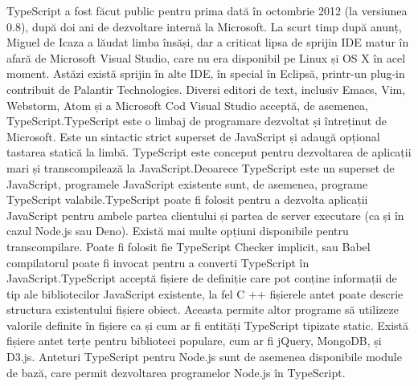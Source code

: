 \par TypeScript a fost făcut public pentru prima dată în octombrie 2012 (la versiunea 0.8), după doi ani de dezvoltare internă la Microsoft. La scurt timp după anunț, Miguel de Icaza a lăudat limba însăși, dar a criticat lipsa de sprijin IDE matur în afară de Microsoft Visual Studio, care nu era disponibil pe Linux și OS X în acel moment. Astăzi există sprijin în alte IDE, în special în Eclipsă, printr-un plug-in contribuit de Palantir Technologies. Diversi editori de text, inclusiv Emacs, Vim, Webstorm, Atom și a Microsoft Cod Visual Studio acceptă, de asemenea, TypeScript.TypeScript este o limbaj de programare dezvoltat și întreținut de Microsoft. Este un sintactic strict superset de JavaScript și adaugă opțional tastarea statică la limbă. TypeScript este conceput pentru dezvoltarea de aplicații mari și transcompilează la JavaScript.Deoarece TypeScript este un superset de JavaScript, programele JavaScript existente sunt, de asemenea, programe TypeScript valabile.TypeScript poate fi folosit pentru a dezvolta aplicații JavaScript pentru ambele partea clientului și partea de server executare (ca și în cazul Node.js sau Deno). Există mai multe opțiuni disponibile pentru transcompilare. Poate fi folosit fie TypeScript Checker implicit, sau Babel compilatorul poate fi invocat pentru a converti TypeScript în JavaScript.TypeScript acceptă fișiere de definiție care pot conține informații de tip ale bibliotecilor JavaScript existente, la fel C ++ fișierele antet poate descrie structura existentului fișiere obiect. Aceasta permite altor programe să utilizeze valorile definite în fișiere ca și cum ar fi entități TypeScript tipizate static. Există fișiere antet terțe pentru biblioteci populare, cum ar fi jQuery, MongoDB, și D3.js. Anteturi TypeScript pentru Node.js sunt de asemenea disponibile module de bază, care permit dezvoltarea programelor Node.js în TypeScript.